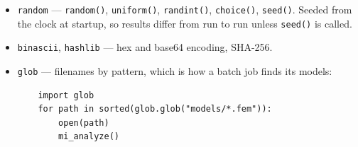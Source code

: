 \begin{itemize}
\begin{verbatim}
    import csv
    f = open("results.csv", "w", newline="")
    w = csv.writer(f)
    w.writerow(["n", "x", "y"])
    w.writerow([1, 0.5, 1.0])
    f.close()
\end{verbatim}

\noindent
Without \verb+newline=""+ every line ends with an extra carriage return,
and Excel then shows a blank row between each pair of records.  This is
not a FEMM quirk --- desktop Python behaves the same way on Windows, and
for the same reason.  A file being read benefits from it too: it is what
lets a quoted field contain a line break.
\item{\tt random} --- {\tt random()}, {\tt uniform()}, {\tt randint()},
{\tt choice()}, {\tt seed()}.  Seeded from the clock at startup, so results
differ from run to run unless {\tt seed()} is called.
\item{\tt binascii}, {\tt hashlib} --- hex and base64 encoding, SHA-256.
\item{\tt glob} --- filenames by pattern, which is how a batch job finds its
models:

\begin{verbatim}
    import glob
    for path in sorted(glob.glob("models/*.fem")):
        open(path)
        mi_analyze()
\end{verbatim}


\end{itemize}
